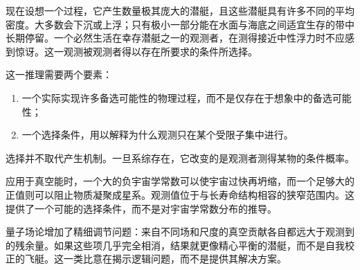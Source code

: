 现在设想一个过程，它产生数量极其庞大的潜艇，且这些潜艇具有许多不同的平均密度。大多数会下沉或上浮；只有极小一部分能在水面与海底之间适宜生存的带中长期停留。一个必然生活在幸存潜艇之一的观测者，在测得接近中性浮力时不应感到惊讶。这一观测被观测者得以存在所要求的条件所选择。

这一推理需要两个要素：
\begin{enumerate}
\item 一个实际实现许多备选可能性的物理过程，而不是仅存在于想象中的备选可能性；
\item 一个选择条件，用以解释为什么观测只在某个受限子集中进行。
\end{enumerate}
选择并不取代产生机制。一旦系综存在，它改变的是观测者测得某物的条件概率。

\begin{classroomqa}
\end{classroomqa}

应用于真空能时，一个大的负宇宙学常数可以使宇宙过快再坍缩，而一个足够大的正值则可以阻止物质凝聚成星系。观测值位于与长寿命结构相容的狭窄范围内。这提供了一个可能的选择条件，而不是对宇宙学常数分布的推导。

量子场论增加了精细调节问题：来自不同场和尺度的真空贡献各自都远大于观测到的残余量。如果这些项几乎完全相消，结果就更像精心平衡的潜艇，而不是自我校正的飞艇。这一类比意在揭示逻辑问题，而不是提供其解决方案。

\begin{classroomqa}
\end{classroomqa}

